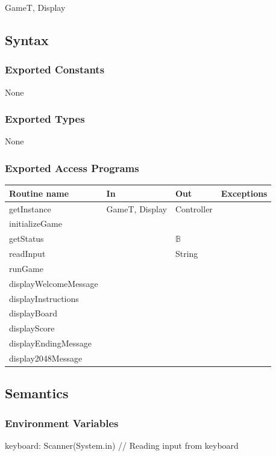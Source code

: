 \documentclass[12pt]{article}
\begin{document}
GameT, Display

\subsection* {Syntax}

\subsubsection* {Exported Constants}

None

\subsubsection* {Exported Types}

None

\subsubsection* {Exported Access Programs}

\begin{tabular}{| l | l | l | p{5cm} |}
  \hline
  \textbf{Routine name} & \textbf{In} & \textbf{Out} & \textbf{Exceptions}\\
  \hline
  getInstance & GameT, Display & Controller & ~\\
  \hline
  initializeGame &  &  & ~\\
  \hline
  getStatus &  & $\mathbb{B}$ & ~\\
  \hline
  readInput &  & String & ~\\
  \hline
  runGame &  &  & ~\\
  \hline
  displayWelcomeMessage &  &  & ~\\
  \hline
  displayInstructions &  &  & ~\\
  \hline
  displayBoard &  &  & ~\\
  \hline
  displayScore &  &  & ~\\
  \hline
  displayEndingMessage &  &  & ~\\
  \hline
  display2048Message &  &  & ~\\
  \hline
  
\end{tabular}


\subsection* {Semantics}

\subsubsection* {Environment Variables}
keyboard: Scanner(System.in) // Reading input from keyboard
\end{document}
